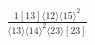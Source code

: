 \documentclass[varwidth, border=5pt]{standalone}
\begin{document}
\begin{my}
$\begin{gathered}
\scriptscriptstyle\frac{1[13]⟨12⟩⟨15⟩^2}{⟨13⟩⟨14⟩^2⟨23⟩[23]}
\end{gathered}$
\end{my}
\end{document}
